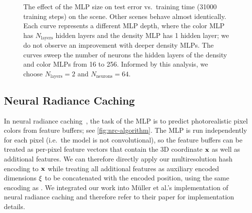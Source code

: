 \documentclass[acmtog,authorversion]{acmart}
\begin{document}

\begin{figure}
  \sffamily
  \small
  \pgfplotsset{width=9.0cm, height=4.0cm}
  \vspace{-2.2mm}
  \hspace{-2mm}
  
  \vspace{-4.1mm}
  \caption{\label{fig:nerf_network_sweep}%
    The effect of the MLP size on test error vs.\ training time (\num{31000} training steps) on the \sceneLego{} scene.
    Other scenes behave almost identically.
    Each curve represents a different MLP depth, where the color MLP has $N_\mathrm{layers}$ hidden layers and the density MLP has \num{1} hidden layer; we do not observe an improvement with deeper density MLPs.
    The curves sweep the number of neurons the hidden layers of the density and color MLPs from \num{16} to \num{256}.
    Informed by this analysis, we choose ${N_\mathrm{layers} = 2}$ and ${N_\mathrm{neurons} = 64}$.
  }\vspace{-2mm}
\end{figure}

\subsection{Neural Radiance Caching}\label{Sec:Experiments:nrc}

In neural radiance caching~\cite{mueller2021realtime}, the task of the MLP is to predict photorealistic pixel colors from feature buffers; see \autoref{fig:nrc-algorithm}.
The MLP is run independently for each pixel (i.e.\ the model is not convolutional), so the feature buffers can be treated as per-pixel feature vectors that contain the 3D coordinate $\mathbf{x}$ as well as additional features.
We can therefore directly apply our multiresolution hash encoding to $\mathbf{x}$ while treating all additional features as auxiliary encoded dimensions $\mathbf{\xi}$ to be concatenated with the encoded position, using the same encoding as \citet{mueller2021realtime}.
We integrated our work into M\"uller et al.'s implementation of neural radiance caching and therefore refer to their paper for implementation details.
\end{document}
